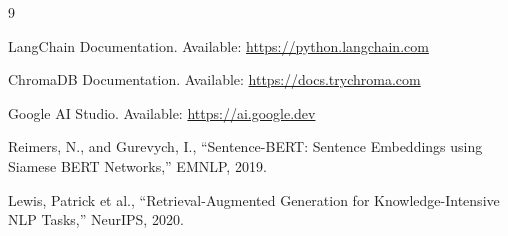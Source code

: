 \documentclass[11pt]{article}
\begin{document}

\begin{thebibliography}{9}

LangChain Documentation.
Available: \url{https://python.langchain.com}

ChromaDB Documentation.
Available: \url{https://docs.trychroma.com}

Google AI Studio.
Available: \url{https://ai.google.dev}

Reimers, N., and Gurevych, I.,
``Sentence-BERT: Sentence Embeddings using Siamese BERT Networks,''
EMNLP, 2019.

Lewis, Patrick et al.,
``Retrieval-Augmented Generation for Knowledge-Intensive NLP Tasks,''
NeurIPS, 2020.

\end{thebibliography}
\end{document}
